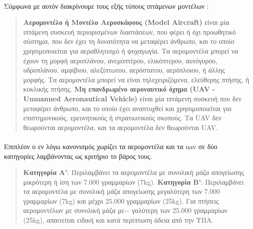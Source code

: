 \documentclass[a4paper, 12pt, twoside]{report}
\begin{document}
{{{{{{			\paragraph{}{Σύμφωνα με αυτόν διακρίνουμε τους εξής τύπους ιπτάμενων μοντέλων :
			\begin{quote}
				\textbf{Αερομοντέλο ή Μοντέλο Αεροσκάφους (Model Aircraft)} είναι μία ιπτάμενη συσκευή περιορισμένων διαστάσεων, που φέρει ή όχι προωθητικό σύστημα, που δεν έχει τη δυνατότητα να μεταφέρει άνθρωπο, και το οποίο χρησιμοποιείται για αεραθλητισμό ή ψυχαγωγία. Τα αερομοντέλα μπορεί να έχουν τη μορφή αεροπλάνου, ανεμοπτέρου, ελικόπτερου, αυτόγυρου, υδροπλάνου, αμφίβιου, αλεξίπτωτου, αερόστατου, αερόπλοιου, ή άλλης μορφής. Τα αερομοντέλα μπορεί να είναι τηλεχειριζόμενα, ελεύθερης πτήσης, ή κυκλικής πτήσης.\linebreak
				\textbf{Μη επανδρωμένο αεροναυτικό όχημα (UAV - Unmanned Aeronautical Vehicle)} είναι μία ιπτάμενη συσκευή που δεν μεταφέρει άνθρωπο, και το οποίο έχει αναπτυχθεί και χρησιμοποιείται για επιστημονικούς, ερευνητικούς ή στρατιωτικούς σκοπούς. Τα UAV δεν θεωρούνται αερομοντέλα, και τα αερομοντέλα δεν θεωρούνται UAV.			
			\end{quote}
			}
			\paragraph{}{Επιπλέον ο εν λόγω κανονισμός χωρίζει τα αερομοντέλα και τα uav σε δύο κατηγορίες λαμβάνοντας ως κριτήριο το βάρος τους.
			\begin{quote}
				\textbf{Κατηγορία Α'}: Περιλαμβάνει τα αερομοντέλα με συνολική μάζα απογείωσης μικρότερη ή ίση των 7.000 γραμμαρίων (7kg).\linebreak
				\textbf{Κατηγορία Β'}: Περιλαμβάνει τα αερομοντέλα με συνολική μάζα απογείωσης μεγαλύτερη των 7.000 γραμμαρίων (7kg) και μέχρι 25.000 γραμμαρίων (25kg).\linebreak
				Για πτήσεις αερομοντέλων με συνολική μάζα με−
γαλύτερη των 25.000 γραμμαρίων (25kg), απαιτείται ειδική και κατά περίπτωση άδεια από την ΥΠΑ.
			\end{quote}
			}
			
}}}}}}
\end{document}
